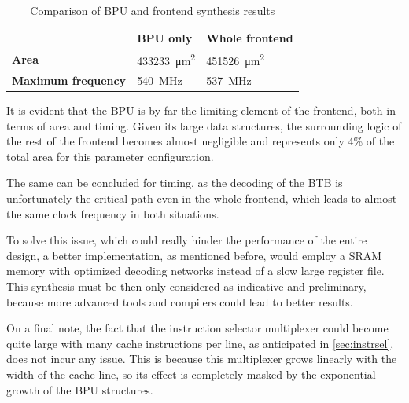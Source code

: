 \begin{table}[hbt]
  \centering
  \begin{tabular}{lll}
    \toprule
                                & \textbf{BPU only}           & \textbf{Whole frontend}     \\ \midrule
    \textbf{Area}               & \SI{433233}{\micro\meter^2} & \SI{451526}{\micro\meter^2} \\ \midrule
    \textbf{Maximum frequency}  & \SI{540}{MHz}               & \SI{537}{MHz}               \\
    \bottomrule
  \end{tabular}
  \caption{Comparison of BPU and frontend synthesis results}
  \label{tab:frontend}
\end{table}

It is evident that the \ac{BPU} is by far the limiting element of the frontend, both in terms of area and timing. Given its large data structures, the surrounding logic of the rest of the frontend becomes almost negligible and represents only 4\% of the total area for this parameter configuration.

The same can be concluded for timing, as the decoding of the \ac{BTB} is unfortunately the critical path even in the whole frontend, which leads to almost the same clock frequency in both situations.

To solve this issue, which could really hinder the performance of the entire design, a better implementation, as mentioned before, would employ a SRAM memory with optimized decoding networks instead of a slow large register file. This synthesis must be then only considered as indicative and preliminary, because more advanced tools and compilers could lead to better results.

On a final note, the fact that the instruction selector multiplexer could become quite large with many cache instructions per line, as anticipated in \cref{sec:instrsel}, does not incur any issue. This is because this multiplexer grows linearly with the width of the cache line, so its effect is completely masked by the exponential growth of the \ac{BPU} structures.
